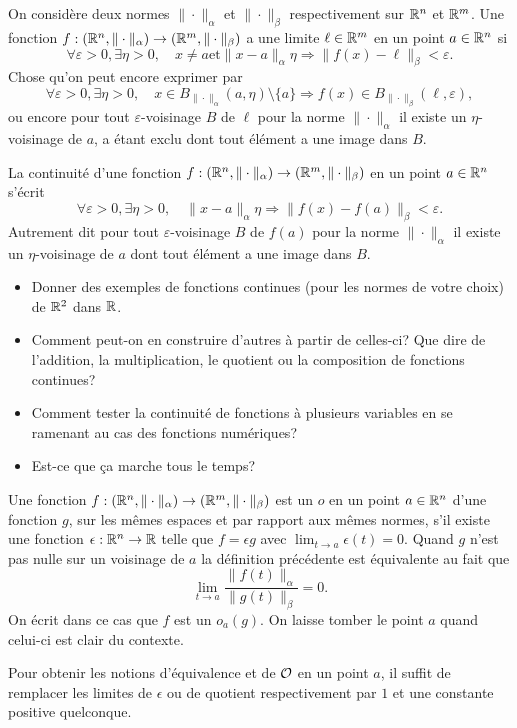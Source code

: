 \documentclass[11pt, a4paper]{article}
\begin{document}
\begin{exmp}
  On considère deux normes $\|\cdot\|_\alpha$ et $\|\cdot\|_\beta$
  respectivement sur $\mathbb{R}^n$ et $\mathbb{R}^m$. Une fonction
  $f : (\mathbb{R}^n, \|\cdot\|_\alpha) \to (\mathbb{R}^m, \|\cdot\|_\beta)$ a une
  limite $\ell \in \mathbb{R}^m$ en un point $a \in \mathbb{R}^n$ si
  \[
    \forall \varepsilon > 0, \exists \eta > 0, \quad x \neq a
    \mathrm{ et } \|x - a\|_\alpha \eta \Rightarrow \|f(x) -
    \ell\|_\beta < \varepsilon.
  \]
  Chose qu'on peut encore exprimer par
  \[
    \forall \varepsilon > 0, \exists \eta > 0, \quad x \in
    B_{\|\cdot\|_\alpha}(a, \eta)\setminus \{a\} \Rightarrow f(x) \in
    B_{\|\cdot\|_\beta}(\ell, \varepsilon),
  \]
  ou encore pour tout $\varepsilon$-voisinage $B$ de $\ell$ pour la
  norme $\|\cdot\|_\alpha$ il existe un $\eta$-voisinage de $a$, a
  étant exclu dont tout élément a une image dans $B$.
\end{exmp}
\begin{exmp}
  La continuité d'une fonction
  $f : (\mathbb{R}^n, \|\cdot\|_\alpha) \to (\mathbb{R}^m, \|\cdot\|_\beta)$ en un
  point $a \in \mathbb{R}^n$ s'écrit
  \[
    \forall \varepsilon > 0, \exists \eta > 0, \quad \|x - a\|_\alpha
    \eta \Rightarrow \|f(x) - f(a)\|_\beta < \varepsilon.
  \]
  Autrement dit pour tout $\varepsilon$-voisinage $B$ de $f(a)$ pour
  la norme $\|\cdot\|_\alpha$ il existe un $\eta$-voisinage de $a$
  dont tout élément a une image dans $B$.
\end{exmp}
\begin{question}
  \begin{itemize}
  \item Donner des exemples de fonctions continues (pour les normes de
    votre choix) de $\mathbb{R}^2$ dans $\mathbb{R}$.
  \item Comment peut-on en construire d'autres à partir de celles-ci?
    Que dire de l'addition, la multiplication, le quotient ou la
    composition de fonctions continues?
  \item Comment tester la continuité de fonctions à plusieurs
    variables en se ramenant au cas des fonctions numériques?
  \item Est-ce que \c{c}a marche tous le temps?
  \end{itemize}
\end{question}
\begin{exmp}
  Une fonction
  $f : (\mathbb{R}^n, \|\cdot\|_\alpha) \to (\mathbb{R}^m, \|\cdot\|_\beta)$ est un
  $o$ en un point $a \in \mathbb{R}^n$ d'une fonction $g$, sur les mêmes
  espaces et par rapport aux mêmes normes, s'il existe une fonction
  $\epsilon : \mathbb{R}^n \to \mathbb{R}$ telle que $f = \epsilon g$ avec
  $\lim_{t \to a }\epsilon(t) = 0$. Quand $g$ n'est pas nulle sur un
  voisinage de $a$ la définition précédente est équivalente au fait que
  \[
    \lim_{t \to a} \frac{\|f(t)\|_\alpha}{\|g(t)\|_\beta}  = 0.
  \]
  On écrit dans ce cas que $f$ est un $o_a(g)$. On laisse tomber le
  point $a$ quand celui-ci est clair du contexte.

  Pour obtenir les notions d'équivalence et de $\mathcal{O}$ en un point
  $a$, il suffit de remplacer les limites de $\epsilon$ ou de quotient
  respectivement par $1$ et une constante positive quelconque.
\end{exmp}
\end{document}
